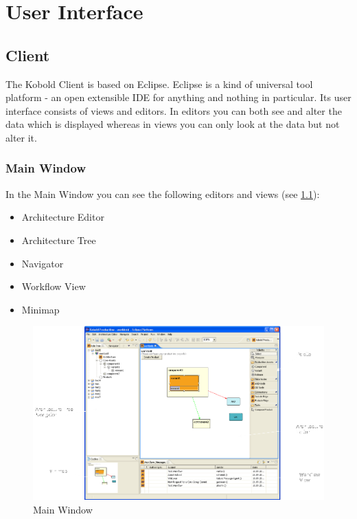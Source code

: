 \chapter{User Interface}

\section{Client}

The Kobold Client is based on Eclipse. Eclipse is a kind of universal tool 
platform - an open extensible IDE for anything and nothing in particular. Its 
user interface consists of views and editors. In editors you can both see and 
alter the data which is displayed whereas in views you can only look at the data 
but not alter it.

\subsection{Main Window}
In the Main Window you can see the following editors and views (see \ref{main}):
\begin{itemize}
	\item Architecture Editor
	\item Architecture Tree
	\item Navigator
	\item Workflow View
	\item Minimap
\end{itemize}

\begin{figure}[h!]
\begin{center}
\includegraphics[width=15cm]{main.png}
   \caption{Main Window}
\label{main}
\end{center}
\end{figure}\par

